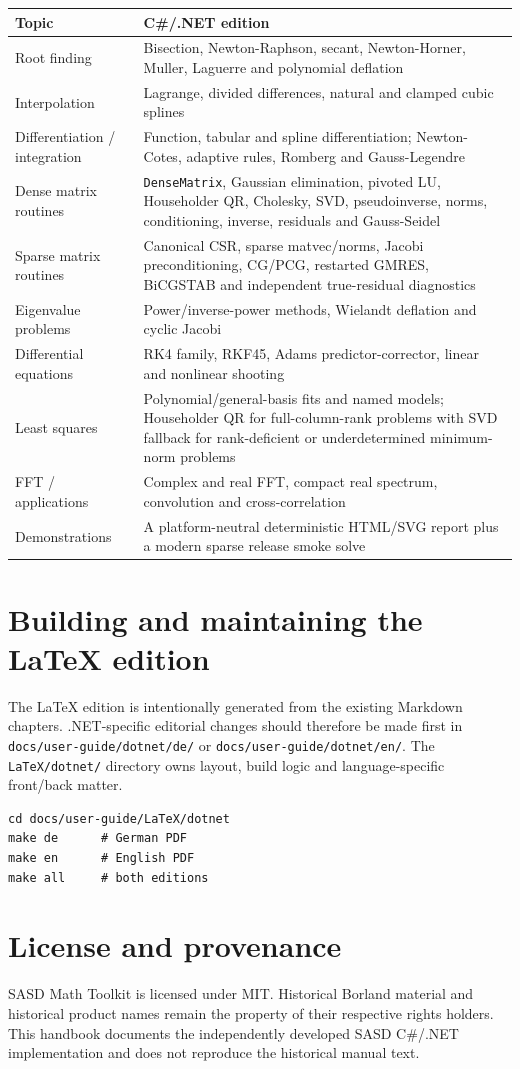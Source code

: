 \documentclass[11pt,a4paper,twoside,openright]{book}
\begin{document}
\begin{longtable}{@{}p{}p{}@{}}
\toprule
\textbf{Topic} & \textbf{C\#/.NET edition}\\
\midrule
Root finding & Bisection, Newton-Raphson, secant, Newton-Horner, Muller, Laguerre and polynomial deflation\\
Interpolation & Lagrange, divided differences, natural and clamped cubic splines\\
Differentiation / integration & Function, tabular and spline differentiation; Newton-Cotes, adaptive rules, Romberg and Gauss-Legendre\\
Dense matrix routines & \texttt{DenseMatrix}, Gaussian elimination, pivoted LU, Householder QR, Cholesky, SVD, pseudoinverse, norms, conditioning, inverse, residuals and Gauss-Seidel\\
Sparse matrix routines & Canonical CSR, sparse matvec/norms, Jacobi preconditioning, CG/PCG, restarted GMRES, BiCGSTAB and independent true-residual diagnostics\\
Eigenvalue problems & Power/inverse-power methods, Wielandt deflation and cyclic Jacobi\\
Differential equations & RK4 family, RKF45, Adams predictor-corrector, linear and nonlinear shooting\\
Least squares & Polynomial/general-basis fits and named models; Householder QR for full-column-rank problems with SVD fallback for rank-deficient or underdetermined minimum-norm problems\\
FFT / applications & Complex and real FFT, compact real spectrum, convolution and cross-correlation\\
Demonstrations & A platform-neutral deterministic HTML/SVG report plus a modern sparse release smoke solve\\
\bottomrule
\end{longtable}

\chapter{Building and maintaining the LaTeX edition}
The LaTeX edition is intentionally generated from the existing Markdown chapters. .NET-specific editorial changes should therefore be made first in \texttt{docs/user-guide/dotnet/de/} or \texttt{docs/user-guide/dotnet/en/}. The \texttt{LaTeX/dotnet/} directory owns layout, build logic and language-specific front/back matter.

\begin{lstlisting}
cd docs/user-guide/LaTeX/dotnet
make de      # German PDF
make en      # English PDF
make all     # both editions
\end{lstlisting}

\backmatter
\chapter*{License and provenance}
SASD Math Toolkit is licensed under MIT. Historical Borland material and historical product names remain the property of their respective rights holders. This handbook documents the independently developed SASD C\#/.NET implementation and does not reproduce the historical manual text.
\end{document}
